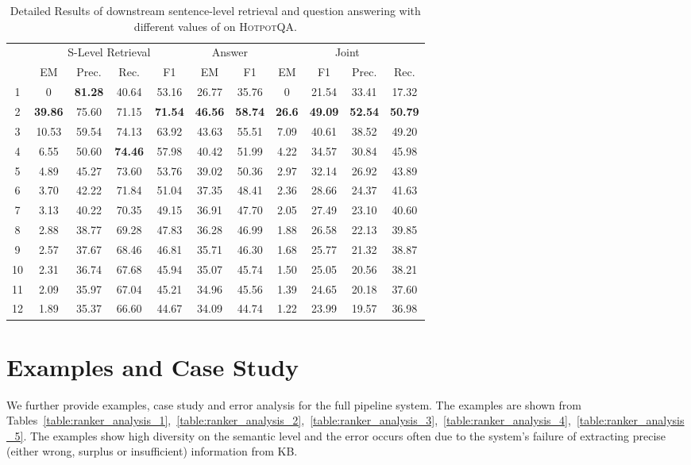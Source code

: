 \documentclass[11pt,a4paper]{article}
\newcommand\hpqa{\textsc{HotpotQA}\xspace}
\begin{document}
\begin{table*}[t]
\centering
\begin{tabular}{ccccccccccc}
\toprule
\multirow{2}{*}{} &
\multicolumn{4}{c}{S-Level Retrieval} &
\multicolumn{2}{c}{Answer} &
\multicolumn{4}{c}{Joint} \\
\cmidrule(lr){2-5}
\cmidrule(lr){6-7}
\cmidrule(lr){8-11}
 & EM & Prec. & Rec. & F1 & EM & F1 & EM & F1 & Prec. & Rec.\\
\midrule

1 & 0 & \textbf{81.28} & 40.64 & 53.16 & 26.77 & 35.76 & 0 & 21.54 & 33.41 & 17.32\\
2 & \textbf{39.86} & 75.60 & 71.15 & \textbf{71.54} & \textbf{46.56} & \textbf{58.74} & \textbf{26.6} & \textbf{49.09} & \textbf{52.54} & \textbf{50.79}\\
3 & 10.53 & 59.54 & 74.13 & 63.92 & 43.63 & 55.51 & 7.09 & 40.61 & 38.52 & 49.20\\
4 & 6.55 & 50.60 & \textbf{74.46} & 57.98 & 40.42 & 51.99 & 4.22 & 34.57 & 30.84 & 45.98\\
5 & 4.89 & 45.27 & 73.60 & 53.76 & 39.02 & 50.36 & 2.97 & 32.14 & 26.92 & 43.89\\
6 & 3.70 & 42.22 & 71.84 & 51.04 & 37.35 & 48.41 & 2.36 & 28.66 & 24.37 & 41.63\\
7 & 3.13 & 40.22 & 70.35 & 49.15 & 36.91 & 47.70 & 2.05 & 27.49 & 23.10 & 40.60\\
8 & 2.88 & 38.77 & 69.28 & 47.83 & 36.28 & 46.99 & 1.88 & 26.58 & 22.13 & 39.85\\
9 & 2.57 & 37.67 & 68.46 & 46.81 & 35.71 & 46.30 & 1.68 & 25.77 & 21.32 & 38.87\\
10 & 2.31 & 36.74 & 67.68 & 45.94 & 35.07 & 45.74 & 1.50 & 25.05 & 20.56 & 38.21\\
11 & 2.09 & 35.97 & 67.04 & 45.21 & 34.96 & 45.56 & 1.39 & 24.65 & 20.18 & 37.60\\
12 & 1.89 & 35.37 & 66.60 & 44.67 & 34.09 & 44.74 & 1.22 & 23.99 & 19.57 & 36.98\\


\bottomrule
\end{tabular}

\caption{Detailed Results of downstream sentence-level retrieval and question answering with different values of  on \hpqa.}
\label{tab:hotpot_detail_p_level_results}
\end{table*}



\section{Examples and Case Study}
We further provide examples, case study and error analysis for the full pipeline system. The examples are shown from Tables~\ref{table:ranker_analysis_1},~\ref{table:ranker_analysis_2},~\ref{table:ranker_analysis_3},~\ref{table:ranker_analysis_4},~\ref{table:ranker_analysis_5}. The examples show high diversity on the semantic level and the error occurs often due to the system's failure of extracting precise (either wrong, surplus or insufficient) information from KB.
\end{document}

